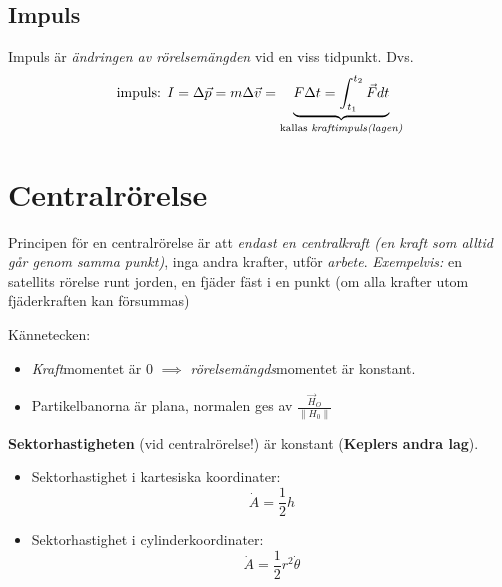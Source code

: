 \documentclass{article}
\newenvironment{ankiflashcard}[1]{}{}
\begin{document}
\begin{paracol}{2}
\begin{ankiflashcard}{Definiera vad impuls är. Definiera även kraftimpulslagen.}
    
\subsection{Impuls}
Impuls är \textit{ändringen av rörelsemängden} vid en viss tidpunkt. Dvs.
$$\text{impuls: } I = \Delta \vec p = m \Delta \vec v = \underbrace{F\Delta t =  \int_{t_1}^{t_2} \vec F dt}_{\text{kallas \textit{kraftimpuls(lagen)}}}$$
\end{ankiflashcard}

\begin{ankiflashcard}{Definiera centralrörelse och dess kännetecken.}
    \section{Centralrörelse}
  
    Principen för en centralrörelse är att \textit{endast en centralkraft (en kraft som alltid går genom samma punkt)}, inga andra krafter, utför \textit{arbete}. \textit{Exempelvis:} en satellits rörelse runt jorden, en fjäder fäst i en punkt (om alla krafter utom fjäderkraften kan försummas)

    Kännetecken:
    \begin{itemize}
        \item \textit{Kraft}momentet är $0$ $\implies$ \textit{rörelsemängds}momentet är konstant. 
        \item Partikelbanorna är plana, normalen ges av $\frac{\vec H_O}{\left\| H_0 \right\|}$
    \end{itemize}
\end{ankiflashcard}

\begin{ankiflashcard}{Definiera sektorhastigheten vid centralrörelse}
    \textbf{Sektorhastigheten} (vid centralrörelse!) är konstant (\textbf{Keplers andra lag}).
    \begin{itemize}
        \item Sektorhastighet i kartesiska koordinater:
        $$\dot A = \frac 1 2 h$$
        \item  Sektorhastighet i cylinderkoordinater:     $$\dot A = \frac 1 2 r^2 \dot \theta$$
    \end{itemize}
\end{ankiflashcard}
\begin{ankiflashcard}{Formulera Binets formel.}

\end{ankiflashcard}
\end{paracol}
\end{document}
